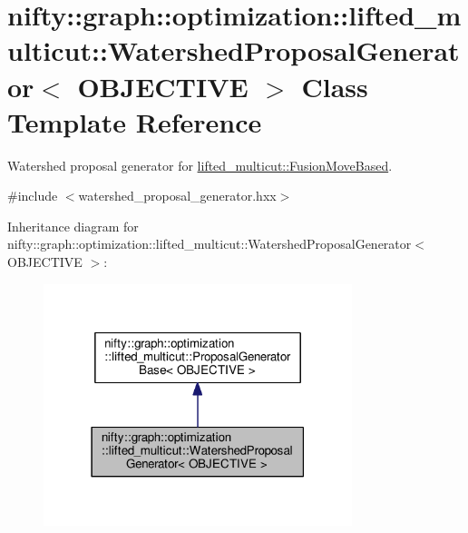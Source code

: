 \hypertarget{classnifty_1_1graph_1_1optimization_1_1lifted__multicut_1_1WatershedProposalGenerator}{}\section{nifty\+:\+:graph\+:\+:optimization\+:\+:lifted\+\_\+multicut\+:\+:Watershed\+Proposal\+Generator$<$ O\+B\+J\+E\+C\+T\+I\+V\+E $>$ Class Template Reference}
\label{classnifty_1_1graph_1_1optimization_1_1lifted__multicut_1_1WatershedProposalGenerator}


Watershed proposal generator for \hyperlink{classnifty_1_1graph_1_1optimization_1_1lifted__multicut_1_1FusionMoveBased}{lifted\+\_\+multicut\+::\+Fusion\+Move\+Based}.  




{\ttfamily \#include $<$watershed\+\_\+proposal\+\_\+generator.\+hxx$>$}



Inheritance diagram for nifty\+:\+:graph\+:\+:optimization\+:\+:lifted\+\_\+multicut\+:\+:Watershed\+Proposal\+Generator$<$ O\+B\+J\+E\+C\+T\+I\+V\+E $>$\+:\nopagebreak
\begin{figure}[H]
\begin{center}
\leavevmode
\includegraphics[width=255pt]{classnifty_1_1graph_1_1optimization_1_1lifted__multicut_1_1WatershedProposalGenerator__inherit__graph}
\end{center}
\end{figure}


